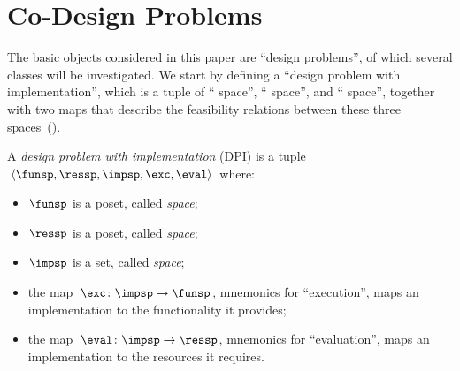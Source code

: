 \section{Co-Design Problems\label{sec:Design-Problems}}

The basic objects considered in this paper are ``design problems'',
of which several classes will be investigated. We start by defining
a ``design problem with implementation'', which is a tuple of ``
space'', `` space'', and ``
space'', together with two maps that describe the feasibility relations
between these three spaces~().
\begin{defn}
\label{def:design_problem}A \emph{design problem with implementation}
(DPI) is a tuple $\left\langle \funsp,\ressp,\impsp,\exc,\eval\right\rangle $
where:

\begin{itemize}
\item $\funsp$ is a poset, called \emph{ space};
\item $\ressp$ is a poset, called \emph{ space};
\item $\impsp$ is a set, called \emph{ space};
\item the map~$\exc\colon\impsp\rightarrow\funsp$, mnemonics for ``execution'',
maps an implementation to the functionality it provides;
\item the map~$\eval\colon\impsp\rightarrow\ressp$, mnemonics for ``evaluation'',
maps an implementation to the resources it requires.
\end{itemize}
\end{defn}

